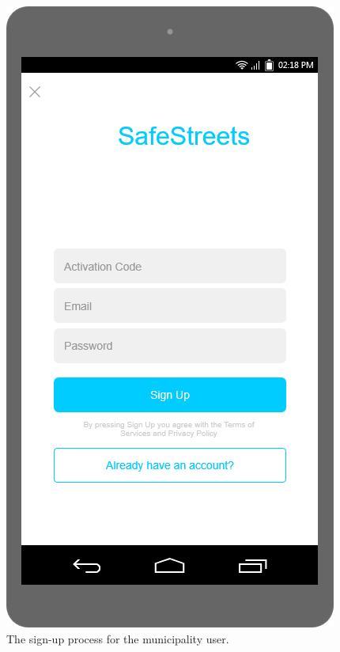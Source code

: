 \documentclass[a4paper]{article}
\newcommand{\mockupheight}{0.4\textheight}
\begin{document}
\begin{figure}[H]
\centering
\includegraphics[height=\mockupheight]{mockup/sign_up}
\caption{The sign-up process for the municipality user.}
\end{figure}
\end{document}
